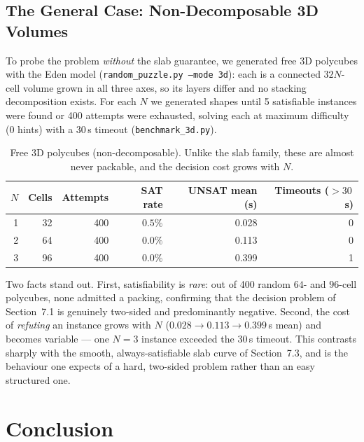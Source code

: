 \documentclass[a4paper,UKenglish,cleveref,autoref]{lipics-v2021}
\begin{document}
\subsection{The General Case: Non-Decomposable 3D Volumes}

To probe the problem \emph{without} the slab guarantee, we generated free 3D
polycubes with the Eden model (\texttt{random\_puzzle.py --mode 3d}): each is a
connected $32N$-cell volume grown in all three axes, so its layers differ and no
stacking decomposition exists.  For each $N$ we generated shapes until 5
satisfiable instances were found or 400 attempts were exhausted, solving each at
maximum difficulty (0 hints) with a 30\,s timeout
(\texttt{benchmark\_3d.py}).

\begin{table}[htbp]
\centering
\caption{Free 3D polycubes (non-decomposable). Unlike the slab family, these
         are almost never packable, and the decision cost grows with $N$.}
\label{tab:bench3d}
\renewcommand{\arraystretch}{1.25}
\begin{tabular}{@{}rrrrrr@{}}
  \toprule
  $N$ & \textbf{Cells} & \textbf{Attempts} & \textbf{SAT rate} &
  \textbf{UNSAT mean (s)} & \textbf{Timeouts ($>30$\,s)} \\
  \midrule
  1 &  32 & 400 & $0.5\%$ & 0.028 & 0 \\
  2 &  64 & 400 & $0.0\%$ & 0.113 & 0 \\
  3 &  96 & 400 & $0.0\%$ & 0.399 & 1 \\
  \bottomrule
\end{tabular}
\end{table}

Two facts stand out.  First, satisfiability is \emph{rare}: out of 400 random
$64$- and $96$-cell polycubes, none admitted a packing, confirming that the
decision problem of Section~7.1 is genuinely two-sided and predominantly
negative.  Second, the cost of \emph{refuting} an instance grows with $N$
($0.028 \to 0.113 \to 0.399$\,s mean) and becomes variable --- one $N=3$
instance exceeded the 30\,s timeout.  This contrasts sharply with the smooth,
always-satisfiable slab curve of Section~7.3, and is the behaviour one expects
of a hard, two-sided problem rather than an easy structured one.

\section{Conclusion}
\end{document}
